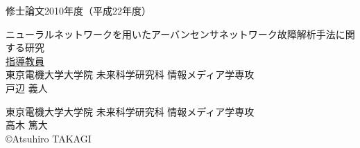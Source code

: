 \pagestyle{empty}
\begin{center}

\LARGE{修士論文\hspace{10mm}2010年度（平成22年度）}\\

\vspace{19mm}

\huge{ニューラルネットワークを用いたアーバンセンサネットワーク故障解析手法に関する研究}\\
\vspace{60mm}
\large{\underline{指導教員}}\\
\large{東京電機大学大学院 未来科学研究科 情報メディア学専攻}\\
\Large{戸辺 義人}\\

\vspace{40mm}

\large{東京電機大学大学院 未来科学研究科 情報メディア学専攻}\\
\LARGE{高木 篤大}\\
\large{\copyright Atsuhiro TAKAGI}\\
\end{center}